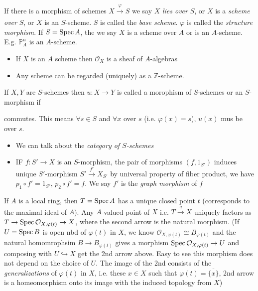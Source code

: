 \documentclass[main]{subfiles}
\begin{document}
\begin{definition}
If there is a morphism of schemes $X\xrightarrow[]{\varphi}S$ we say $X$ \textit{lies over} $S$, or $X$ is a \textit{scheme over} $S$, or $X$ is an $S$-scheme. $S$ is called the \textit{base scheme}. $\varphi$ is called the \textit{structure morphism}. If $S=\operatorname{Spec} A$, the we say $X$ is a scheme over $A$ or is an $A$-scheme. E.g. $\mathbb P_A^n$ is an $A$-scheme.
\begin{itemize}
\item If $X$ is an $A$ scheme then $\mathcal O_X$ is a sheaf of $A$-algebras
\item Any scheme can be regarded (uniquely) as a $\mathbb Z$-scheme.
\end{itemize}
\begin{definition}
If $X,Y$ are $S$-schemes then $u:X\to Y$ is called a morophism of $S$-schemes or an $S$-morphism if
\begin{center}
\end{center}
commutes. This means $\forall s\in S$ and $\forall x$ over $s$ (i.e. $\varphi(x)=s$), $u(x)$ mus be over $s$.
\end{definition}
\begin{itemize}
\item We can talk about the \textit{category of $S$-schemes}
\end{itemize}
\end{definition}

\begin{itemize}
\item IF $f:S'\to X$ is an $S$-morphism, the pair of morphisms $(f,1_{S'})$ induces unique $S'$-morphism $S'\xrightarrow{f'}X_{S'}$ by universal property of fiber product, we have $p_1\circ f'=1_{S'}$, $p_2\circ f'=f$. We say $f'$ is the \textit{graph morphism} of $f$
\end{itemize}

\clubsuit\quad If $A$ is a local ring, then $T=\operatorname{Spec} A$ has a unique closed point $t$ (corresponds to the maximal ideal of $A$). Any $A$-valued point of $X$ i.e. $T\xrightarrow{q}X$ uniquely factors as $T\to\operatorname{Spec} \mathcal O_{X,\varphi(t)}\to X$, where the second arrow is the natural morphism. (If $U=\operatorname{Spec} B$ is open nbd of $\varphi(t)$ in $X$, we know $\mathcal O_{X,\varphi(t)}\cong B_{\varphi(t)}$ and the natural homomrophsim $B\to B_{\varphi(t)}$ gives a morphism $\operatorname{Spec}\mathcal O_{X,\varphi(t)}\to U$ and composing with $U\hookrightarrow X$ get the 2nd arrow above. Easy to see this morphism does not  depend on the choice of $U$. The image of the 2nd consists of the \textit{generalizations} of $\varphi(t)$ in $X$, i.e. these $x\in X$ such that $\varphi(t)=\overline{\{x\}}$, 2nd arrow is a homeomorphism onto its image with the induced topology from $X$)
\end{document}

